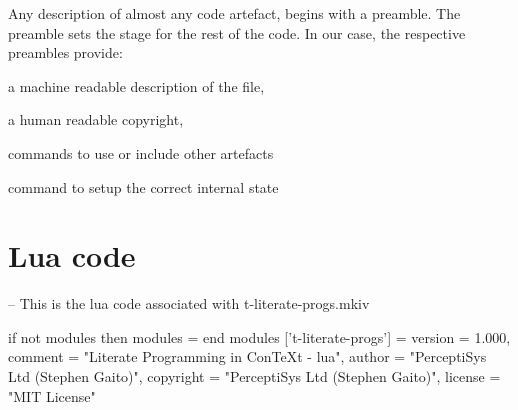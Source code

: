 
\startchapter[title=Preamble]

Any description of almost any code artefact, begins with a preamble. The 
preamble sets the stage for the rest of the code. In our case, the 
respective preambles provide:
%
\startitemize
\item a machine readable description of the file,
\item a human readable copyright,
\item commands to use or include other artefacts
\item command to setup the correct internal state
\stopitemize



\startMkIVCode

%
%


\unprotect

\stopMkIVCode

\section{Lua code}


\startLuaCode
-- This is the lua code associated with t-literate-progs.mkiv

if not modules then modules = { } end
modules ['t-literate-progs'] = {
    version   = 1.000,
    comment   = "Literate Programming in ConTeXt - lua",
    author    = "PerceptiSys Ltd (Stephen Gaito)",
    copyright = "PerceptiSys Ltd (Stephen Gaito)",
    license   = "MIT License"
}

